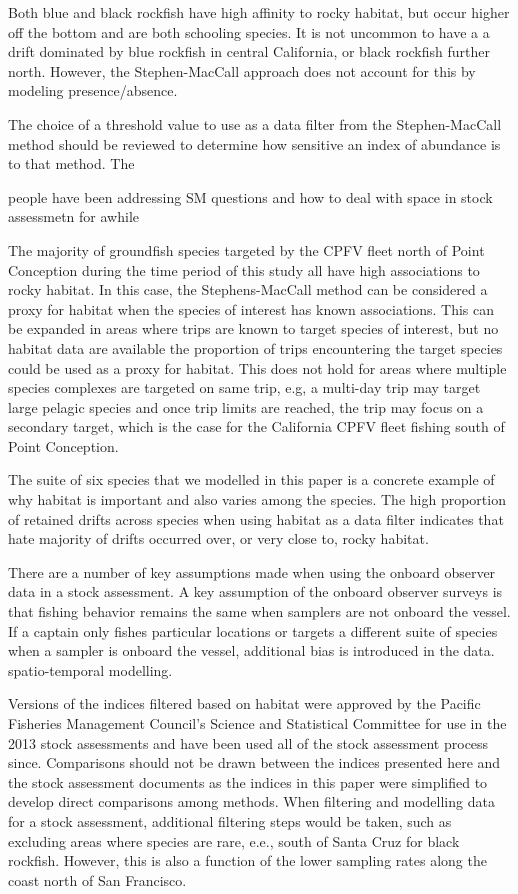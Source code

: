 \documentclass[
  12pt,
  authoryear,
  preprint,
  3p]{elsarticle}
\begin{document}
Both blue and black rockfish have high affinity to rocky habitat, but
occur higher off the bottom and are both schooling species. It is not
uncommon to have a a drift dominated by blue rockfish in central
California, or black rockfish further north. However, the
Stephen-MacCall approach does not account for this by modeling
presence/absence.

The choice of a threshold value to use as a data filter from the
Stephen-MacCall method should be reviewed to determine how sensitive an
index of abundance is to that method. The

people have been addressing SM questions and how to deal with space in
stock assessmetn for awhile

The majority of groundfish species targeted by the CPFV fleet north of
Point Conception during the time period of this study all have high
associations to rocky habitat. In this case, the Stephens-MacCall method
can be considered a proxy for habitat when the species of interest has
known associations. This can be expanded in areas where trips are known
to target species of interest, but no habitat data are available the
proportion of trips encountering the target species could be used as a
proxy for habitat. This does not hold for areas where multiple species
complexes are targeted on same trip, e.g, a multi-day trip may target
large pelagic species and once trip limits are reached, the trip may
focus on a secondary target, which is the case for the California CPFV
fleet fishing south of Point Conception.

The suite of six species that we modelled in this paper is a concrete
example of why habitat is important and also varies among the species.
The high proportion of retained drifts across species when using habitat
as a data filter indicates that hate majority of drifts occurred over,
or very close to, rocky habitat.

There are a number of key assumptions made when using the onboard
observer data in a stock assessment. A key assumption of the onboard
observer surveys is that fishing behavior remains the same when samplers
are not onboard the vessel. If a captain only fishes particular
locations or targets a different suite of species when a sampler is
onboard the vessel, additional bias is introduced in the data.\\
spatio-temporal modelling.

Versions of the indices filtered based on habitat were approved by the
Pacific Fisheries Management Council's Science and Statistical Committee
for use in the 2013 stock assessments and have been used all of the
stock assessment process since. Comparisons should not be drawn between
the indices presented here and the stock assessment documents as the
indices in this paper were simplified to develop direct comparisons
among methods. When filtering and modelling data for a stock assessment,
additional filtering steps would be taken, such as excluding areas where
species are rare, e.e., south of Santa Cruz for black rockfish. However,
this is also a function of the lower sampling rates along the coast
north of San Francisco.
\end{document}
